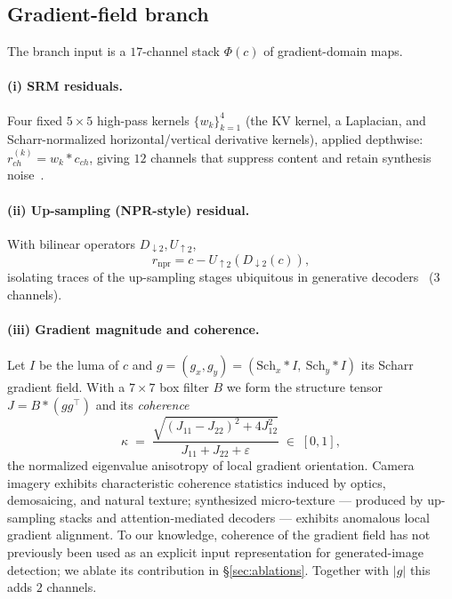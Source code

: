 \documentclass[10pt,twocolumn]{article}
\begin{document}
\subsection{Gradient-field branch}
\label{sec:gradient}
The branch input is a $17$-channel stack $\Phi(c)$ of gradient-domain maps.

\paragraph{(i) SRM residuals.} Four fixed $5{\times}5$ high-pass kernels
$\{w_k\}_{k=1}^{4}$ (the KV kernel, a Laplacian, and Scharr-normalized
horizontal/vertical derivative kernels), applied depthwise:
$r^{(k)}_{ch} = w_k * c_{ch}$, giving $12$ channels that suppress content and
retain synthesis noise~\cite{fridrich2012rich}.

\paragraph{(ii) Up-sampling (NPR-style) residual.} With bilinear operators
$D_{\downarrow2}, U_{\uparrow2}$,
\begin{equation}
r_{\mathrm{npr}} = c - U_{\uparrow2}\!\left(D_{\downarrow2}(c)\right),
\end{equation}
isolating traces of the up-sampling stages ubiquitous in generative
decoders~\cite{tan2024npr} ($3$ channels).

\paragraph{(iii) Gradient magnitude and coherence.} Let $I$ be the luma of
$c$ and $g = (g_x, g_y) = (\mathrm{Sch}_x * I,\ \mathrm{Sch}_y * I)$ its
Scharr gradient field. With a $7{\times}7$ box filter $B$ we form the
structure tensor $J = B * (g g^\top)$ and its \emph{coherence}
\begin{equation}
\kappa \;=\; \frac{\sqrt{(J_{11}-J_{22})^2 + 4J_{12}^2}}
{J_{11}+J_{22}+\varepsilon} \;\in\; [0,1],
\label{eq:coherence}
\end{equation}
the normalized eigenvalue anisotropy of local gradient orientation. Camera
imagery exhibits characteristic coherence statistics induced by optics,
demosaicing, and natural texture; synthesized micro-texture --- produced by
up-sampling stacks and attention-mediated decoders --- exhibits anomalous
local gradient alignment. To our knowledge, coherence of the gradient field
has not previously been used as an explicit input representation for
generated-image detection; we ablate its contribution in
\S\ref{sec:ablations}. Together with $|g|$ this adds $2$ channels.
\end{document}

